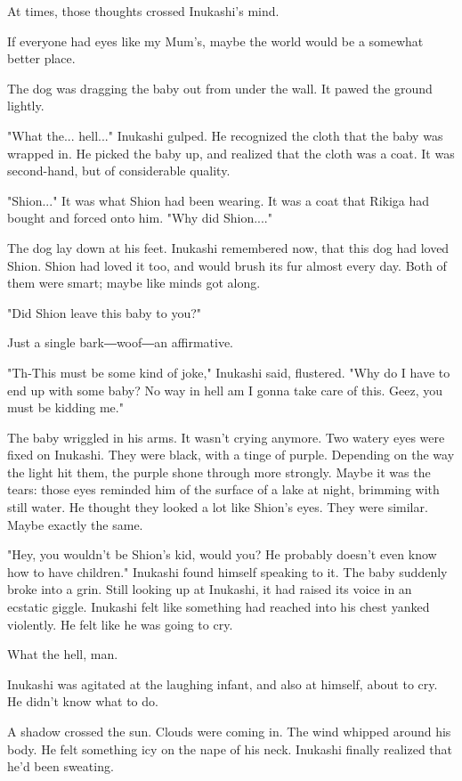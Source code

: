 At times, those thoughts crossed Inukashi's mind.

If everyone had eyes like my Mum's, maybe the world would be a somewhat
better place.

The dog was dragging the baby out from under the wall. It pawed the
ground lightly.

"What the... hell..." Inukashi gulped. He recognized the cloth that the
baby was wrapped in. He picked the baby up, and realized that the cloth
was a coat. It was second-hand, but of considerable quality.

"Shion..." It was what Shion had been wearing. It was a coat that Rikiga
had bought and forced onto him. "Why did Shion...."

The dog lay down at his feet. Inukashi remembered now, that this dog had
loved Shion. Shion had loved it too, and would brush its fur almost
every day. Both of them were smart; maybe like minds got along.

"Did Shion leave this baby to you?"

Just a single bark―woof―an affirmative.

"Th-This must be some kind of joke," Inukashi said, flustered. "Why do I
have to end up with some baby? No way in hell am I gonna take care of
this. Geez, you must be kidding me."

The baby wriggled in his arms. It wasn't crying anymore. Two watery eyes
were fixed on Inukashi. They were black, with a tinge of purple.
Depending on the way the light hit them, the purple shone through more
strongly. Maybe it was the tears: those eyes reminded him of the surface
of a lake at night, brimming with still water. He thought they looked a
lot like Shion's eyes. They were similar. Maybe exactly the same.

"Hey, you wouldn't be Shion's kid, would you? He probably doesn't even
know how to have children." Inukashi found himself speaking to it. The
baby suddenly broke into a grin. Still looking up at Inukashi, it had
raised its voice in an ecstatic giggle. Inukashi felt like something had
reached into his chest yanked violently. He felt like he was going to
cry.

What the hell, man.

Inukashi was agitated at the laughing infant, and also at himself, about
to cry. He didn't know what to do.

A shadow crossed the sun. Clouds were coming in. The wind whipped around
his body. He felt something icy on the nape of his neck. Inukashi
finally realized that he'd been sweating.

